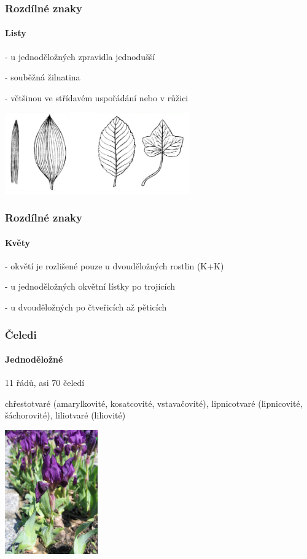 \documentclass{beamer}
\begin{document}
\begin{frame}
\frametitle{Rozdílné znaky}
	\framesubtitle{Listy}

- u jednoděložných zpravidla jednodušší

- souběžná žilnatina

- většinou ve střídavém uspořádání nebo v růžici

\begin{center}\includegraphics[width=8cm]{2.png}\end{center}

\end{frame}
\begin{frame}
\frametitle{Rozdílné znaky}
	\framesubtitle{Květy}

- okvětí je rozlišené pouze u dvouděložných rostlin (K+K)

- u jednoděložných okvětní lístky po trojicích

- u dvouděložných po čtveřicích až pěticích

\end{frame}
\begin{frame}
\frametitle{Čeledi}
	\framesubtitle{Jednoděložné}

11 řádů, asi 70 čeledí

chřestotvaré (amarylkovité, kosatcovité, vstavačovité),  lipnicotvaré (lipnicovité, šáchorovité), liliotvaré (liliovité)

\begin{center}\includegraphics[width=4cm]{800px-Iris_pumila_01.jpg}\end{center}
\end{frame}
\end{document}
